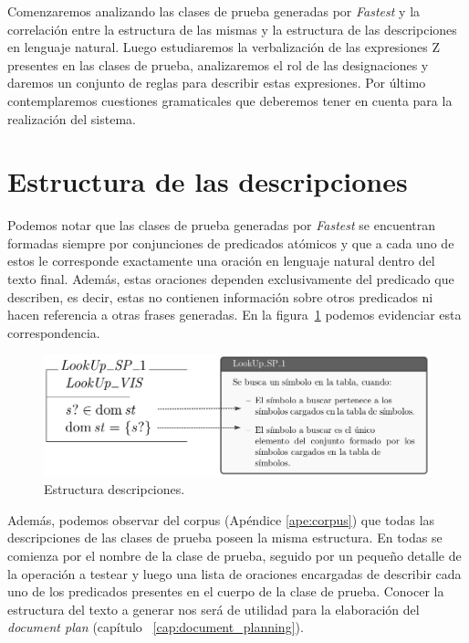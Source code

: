 Comenzaremos analizando las clases de prueba generadas por \emph{Fastest} y la correlación entre la estructura de las mismas y la estructura de las descripciones en lenguaje natural. Luego estudiaremos la verbalización de las expresiones Z presentes en las clases de prueba, analizaremos el rol de las designaciones y daremos un conjunto de reglas para describir estas expresiones. Por último contemplaremos cuestiones gramaticales que deberemos tener en cuenta para la realización del sistema.

\section{Estructura de las descripciones}
\label{sec:corpus_descripciones}
Podemos notar que las clases de prueba generadas por \emph{Fastest} se encuentran formadas siempre por conjunciones de predicados atómicos y que a cada uno de estos le corresponde exactamente una oración en lenguaje natural dentro del texto final. Además, estas oraciones dependen exclusivamente del predicado que describen, es decir, estas no contienen información sobre otros predicados ni hacen referencia a otras frases generadas. En la figura~\ref{fig:ej_test_desc} podemos evidenciar esta correspondencia.

\begin{figure}[H]
\centering
\includegraphics[scale=0.3]{img/ej_test_desc.png}
\caption{Estructura descripciones.}
\label{fig:ej_test_desc}
\end{figure}

Además, podemos observar del corpus (Apéndice \ref{ape:corpus}) que todas las descripciones de las clases de prueba poseen la misma estructura. En todas se comienza por el nombre de la clase de prueba, seguido por un pequeño detalle de la operación a testear y luego una lista de oraciones encargadas de describir cada uno de los predicados presentes en el cuerpo de la clase de prueba. Conocer la estructura del texto a generar nos será de utilidad para la elaboración del \emph{document plan} (capítulo ~\ref{cap:document_planning}).

